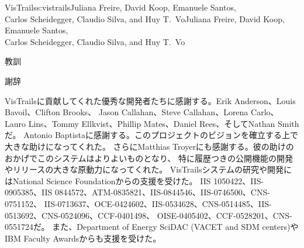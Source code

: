 \begin{aosachaptertoc}{VisTrails}{s:vistrails}{Juliana Freire, David Koop, Emanuele Santos, \\ Carlos Scheidegger, Claudio Silva, and Huy T.\ Vo}{Juliana Freire, David Koop, Emanuele Santos, \\ \hspace*{0.9cm} Carlos Scheidegger, Claudio Silva, and Huy T.\ Vo}
\begin{aosasect1}{教訓}
\begin{aosasect2}{謝辞}

VisTrailsに貢献してくれた優秀な開発者たちに感謝する。Erik Anderson、Louis Bavoil、Clifton Brooks、
Jason Callahan、Steve Callahan、Lorena Carlo、Lauro Lins、Tommy Ellkvist、Phillip Mates、Daniel Rees、そしてNathan Smithだ。
Antonio Baptistaに感謝する。このプロジェクトのビジョンを確立する上で大きな助けになってくれた。
さらにMatthias Troyerにも感謝する。彼の助けのおかげでこのシステムはよりよいものとなり、
特に履歴つきの公開機能の開発やリリースの大きな原動力になってくれた。
VisTrailsシステムの研究や開発にはNational Science Foundationからの支援を受けた。
IIS 1050422、IIS-0905385、IIS 0844572、ATM-0835821、IIS-0844546、IIS-0746500、CNS-0751152、
IIS-0713637、OCE-0424602、IIS-0534628、CNS-0514485、IIS-0513692、CNS-0524096、CCF-0401498、
OISE-0405402、CCF-0528201、CNS-0551724だ。
また、Department of Energy SciDAC (VACET and SDM centers)やIBM Faculty Awardsからも支援を受けた。

\end{aosasect2}

\end{aosasect1}

\end{aosachaptertoc}
